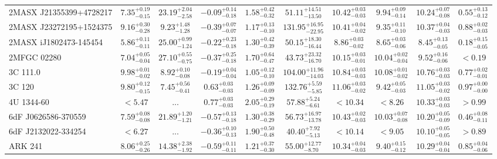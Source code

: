 \documentclass[onecolumn]{mn2e}
\begin{document}
\begin{landscape}
{\begin{center}
\begin{longtable}{lccccccccc}
2MASX J21355399+4728217 & $7.35_{-0.15}^{+0.19}$ & $23.19_{-2.58}^{+2.04}$ & $-0.09_{-0.18}^{+0.14}$ & $1.58_{-0.32}^{+0.42}$ &$51.11_{-13.50}^{+14.51}$ & $10.42_{-0.03}^{+0.03}$ & $9.94_{-0.14}^{+0.09}$ & $10.24_{-0.08}^{+0.07}$ & $0.55_{-0.12}^{+0.13}$ \\
2MASX J23272195+1524375 & $9.16_{-0.28}^{+0.30}$ & $9.23_{-1.28}^{+1.48}$ & $-0.39_{-0.07}^{+0.07}$ & $1.17_{-0.10}^{+0.13}$ &$131.95_{-22.95}^{+16.95}$ & $10.41_{-0.02}^{+0.04}$ & $9.35_{-0.10}^{+0.11}$ & $10.37_{-0.03}^{+0.04}$ & $0.88_{-0.03}^{+0.02}$ \\
2MASX iJ1802473-145454 & $5.86_{-0.11}^{+0.11}$ & $25.00_{-1.24}^{+0.99}$ & $-0.22_{-0.18}^{+0.23}$ & $1.30_{-0.39}^{+0.42}$ &$50.15_{-16.44}^{+18.30}$ & $8.86_{-0.02}^{+0.03}$ & $8.65_{-0.06}^{+0.03}$ & $8.45_{-0.05}^{+0.13}$ & $0.18_{-0.05}^{+0.15}$ \\
2MFGC 02280 & $7.04_{-0.04}^{+0.05}$ & $27.10_{-0.75}^{+0.55}$ & $-0.37_{-0.18}^{+0.25}$ & $1.70_{-0.47}^{+0.64}$ &$43.73_{-16.70}^{+23.32}$ & $10.15_{-0.01}^{+0.03}$ & $10.04_{-0.04}^{+0.02}$ & $9.52_{-0.06}^{+0.16}$ & $<0.19$ \\
3C 111.0 & $9.98_{-0.02}^{+0.01}$ & $8.92_{-0.08}^{+0.10}$ & $-0.19_{-0.04}^{+0.04}$ & $1.05_{-0.10}^{+0.12}$ &$104.00_{-14.03}^{+11.96}$ & $10.84_{-0.03}^{+0.03}$ & $10.08_{-0.02}^{+0.01}$ & $10.76_{-0.03}^{+0.03}$ & $0.77_{-0.01}^{+0.02}$ \\
3C 120 & $9.80_{-0.15}^{+0.12}$ & $7.45_{-0.41}^{+0.56}$ & $0.63_{-0.03}^{+0.03}$ & $1.26_{-0.09}^{+0.09}$ &$132.76_{-5.85}^{+5.59}$ & $11.06_{-0.02}^{+0.03}$ & $9.42_{-0.03}^{+0.05}$ & $11.05_{-0.02}^{+0.03}$ & $0.97_{-0.00}^{+0.00}$ \\
4U 1344-60 & $<5.47$ & ... & $0.77_{-0.03}^{+0.03}$ & $2.05_{-0.19}^{+0.29}$ &$57.88_{-6.61}^{+5.24}$ & $<10.34$ & $<8.26$ & $10.33_{-0.03}^{+0.03}$ & $>0.99$ \\
6dF J0626586-370559 & $7.59_{-0.08}^{+0.08}$ & $21.89_{-1.21}^{+1.20}$ & $-0.57_{-0.18}^{+0.13}$ & $1.30_{-0.29}^{+0.38}$ &$56.73_{-13.78}^{+16.97}$ & $10.43_{-0.03}^{+0.02}$ & $10.03_{-0.08}^{+0.07}$ & $10.20_{-0.09}^{+0.05}$ & $0.46_{-0.11}^{+0.08}$ \\
6dF J2132022-334254 & $<6.27$ & ... & $-0.36_{-0.13}^{+0.10}$ & $1.90_{-0.48}^{+0.50}$ &$40.40_{-5.13}^{+7.92}$ & $<10.14$ & $<9.05$ & $10.10_{-0.05}^{+0.05}$ & $>0.89$ \\
ARK 241 & $8.06_{-0.26}^{+0.25}$ & $14.38_{-1.92}^{+2.38}$ & $-0.59_{-0.11}^{+0.11}$ & $1.21_{-0.30}^{+0.37}$ &$55.00_{-8.70}^{+12.77}$ & $10.34_{-0.03}^{+0.04}$ & $9.40_{-0.12}^{+0.15}$ & $10.29_{-0.04}^{+0.04}$ & $0.85_{-0.06}^{+0.04}$ \\

\end{longtable}
\end{center}}
\end{landscape}
\end{document}
